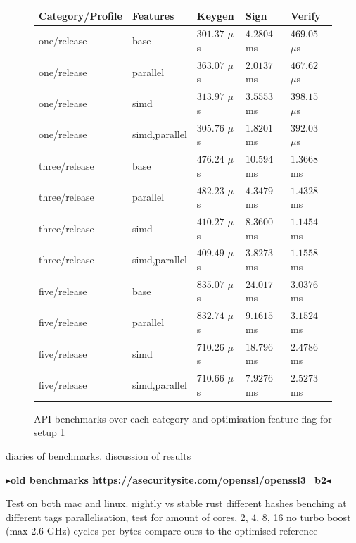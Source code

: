 \documentclass[twoside,11pt]{report}
\theoremstyle{definition}
\theoremstyle{plain}
\newcommand{\todo}[1]{{\color[rgb]{.5,0,0}\textbf{$\blacktriangleright$#1$\blacktriangleleft$}}}
\begin{document}
\begin{figure}
  \centering
  \begin{tabular}{lllll}
    \hline
    Category/Profile & Features      & Keygen         & Sign        & Verify          \\
    \hline
    one/release      & base          & $301.37$ $\mu$s & $4.2804$ ms & $469.05$ $\mu$s \\
    one/release      & parallel      & $363.07$ $\mu$s & $2.0137$ ms & $467.62$ $\mu$s \\
    one/release      & simd          & $313.97$ $\mu$s & $3.5553$ ms & $398.15$ $\mu$s \\
    one/release      & simd,parallel & $305.76$ $\mu$s & $1.8201$ ms & $392.03$ $\mu$s \\
    three/release    & base          & $476.24$ $\mu$s & $10.594$ ms & $1.3668$ ms     \\
    three/release    & parallel      & $482.23$ $\mu$s & $4.3479$ ms & $1.4328$ ms     \\
    three/release    & simd          & $410.27$ $\mu$s & $8.3600$ ms & $1.1454$ ms     \\
    three/release    & simd,parallel & $409.49$ $\mu$s & $3.8273$ ms & $1.1558$ ms     \\
    five/release     & base          & $835.07$ $\mu$s & $24.017$ ms & $3.0376$ ms     \\
    five/release     & parallel      & $832.74$ $\mu$s & $9.1615$ ms & $3.1524$ ms     \\
    five/release     & simd          & $710.26$ $\mu$s & $18.796$ ms & $2.4786$ ms     \\
    five/release     & simd,parallel & $710.66$ $\mu$s & $7.9276$ ms & $2.5273$ ms     \\
    \hline
  \end{tabular}
  \caption{API benchmarks over each category and optimisation feature flag for setup 1}\label{fig:api_benchmarks}
\end{figure}


diaries of benchmarks.
discussion of results

\todo{old benchmarks \url{https://asecuritysite.com/openssl/openssl3_b2}}

Test on both mac and linux.
nightly vs stable rust
different hashes
benching at different tags
parallelisation, test for amount of cores, 2, 4, 8, 16
no turbo boost (max 2.6 GHz)
cycles per bytes
compare ours to the optimised reference

\end{document}
